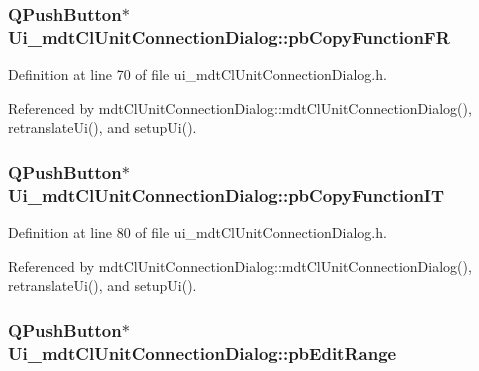 \hypertarget{class_ui__mdt_cl_unit_connection_dialog_afd8c443072d2e813f494a77799c5b800}{
\subsubsection[{pb\-Copy\-Function\-F\-R}]{\setlength{\rightskip}{0pt plus 5cm}Q\-Push\-Button$\ast$ Ui\-\_\-mdt\-Cl\-Unit\-Connection\-Dialog\-::pb\-Copy\-Function\-F\-R}}\label{class_ui__mdt_cl_unit_connection_dialog_afd8c443072d2e813f494a77799c5b800}


Definition at line 70 of file ui\-\_\-mdt\-Cl\-Unit\-Connection\-Dialog.\-h.



Referenced by mdt\-Cl\-Unit\-Connection\-Dialog\-::mdt\-Cl\-Unit\-Connection\-Dialog(), retranslate\-Ui(), and setup\-Ui().

\hypertarget{class_ui__mdt_cl_unit_connection_dialog_a7ccdc4772dbca1919fd77f73e4c1413b}{
\subsubsection[{pb\-Copy\-Function\-I\-T}]{\setlength{\rightskip}{0pt plus 5cm}Q\-Push\-Button$\ast$ Ui\-\_\-mdt\-Cl\-Unit\-Connection\-Dialog\-::pb\-Copy\-Function\-I\-T}}\label{class_ui__mdt_cl_unit_connection_dialog_a7ccdc4772dbca1919fd77f73e4c1413b}


Definition at line 80 of file ui\-\_\-mdt\-Cl\-Unit\-Connection\-Dialog.\-h.



Referenced by mdt\-Cl\-Unit\-Connection\-Dialog\-::mdt\-Cl\-Unit\-Connection\-Dialog(), retranslate\-Ui(), and setup\-Ui().

\hypertarget{class_ui__mdt_cl_unit_connection_dialog_a5bf2e6688ffff68a7dc4eeae6b7f909e}{
\subsubsection[{pb\-Edit\-Range}]{\setlength{\rightskip}{0pt plus 5cm}Q\-Push\-Button$\ast$ Ui\-\_\-mdt\-Cl\-Unit\-Connection\-Dialog\-::pb\-Edit\-Range}}\label{class_ui__mdt_cl_unit_connection_dialog_a5bf2e6688ffff68a7dc4eeae6b7f909e}


